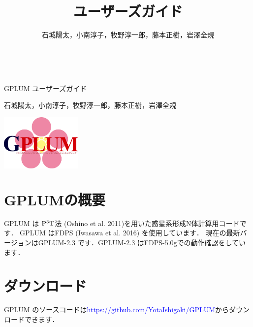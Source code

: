 \documentclass[12pt,a4paper,dvipdfmx]{jsarticle}
\title{\ourcode ユーザーズガイド}
\author{石城陽太，小南淳子，牧野淳一郎，藤本正樹，岩澤全規}
\newcommand{\ourcode}{GPLUM\xspace}
\newcommand{\ourcodeR}{GPLUM-2.3\xspace}
\begin{document}

　\vspace{5mm}

\begin{center}
\hspace{27mm} {\huge \ourcode ユーザーズガイド}

\vspace{7mm}

\hspace{39mm} {\large 石城陽太，小南淳子，牧野淳一郎，藤本正樹，岩澤全規}
\end{center}

\begin{flushleft}
\vspace{-27mm}
\hspace{1mm} \includegraphics[width=4cm]{GPLUM_logo.pdf}
\end{flushleft}

\vspace{15mm}


\tableofcontents



\newpage

\section{GPLUMの概要}

\ourcode は ${\rm P^{3}T}$法 (Oshino et al. 2011)を用いた惑星系形成N体計算用コードです．
\ourcode はFDPS (Iwasawa et al. 2016) を使用しています．
現在の最新バージョンは\ourcodeR です．\ourcodeR はFDPS-5.0gでの動作確認をしています．


\section{ダウンロード}
\ourcode のソースコードは\textcolor{blue}{https://github.com/YotaIshigaki/GPLUM}からダウンロードできます．
\end{document}

